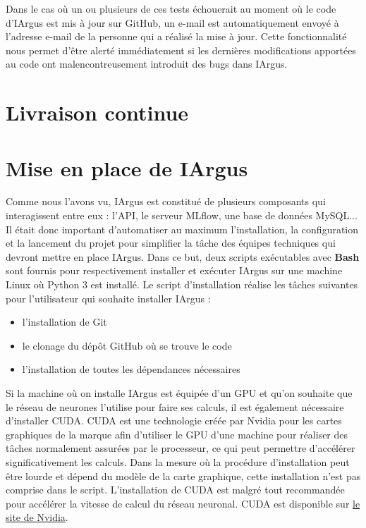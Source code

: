 \documentclass[french]{article}
\begin{document}
    Dans le cas où un ou plusieurs de ces tests échouerait au moment où le code d'IArgus est mis à jour sur GitHub, un e-mail est automatiquement envoyé à l'adresse e-mail de la personne qui a réalisé la mise à jour. Cette fonctionnalité nous permet d'être alerté immédiatement si les dernières modifications apportées au code ont malencontreusement introduit des bugs dans IArgus.


    \section{Livraison continue}
    
    

    \section{Mise en place de IArgus}

    Comme nous l'avons vu, IArgus est constitué de plusieurs composants qui interagissent entre eux : l'API, le serveur MLflow, une base de données MySQL... Il était donc important d'automatiser au maximum l'installation, la configuration et la lancement du projet pour simplifier la tâche des équipes techniques qui devront mettre en place IArgus. Dans ce but, deux scripts exécutables avec \textbf{Bash} sont fournis pour respectivement installer et exécuter IArgus sur une machine Linux où Python 3 est installé. Le script d'installation réalise les tâches suivantes pour l'utilisateur qui souhaite installer IArgus :
    \begin{itemize}
        \item l'installation de Git
        \item le clonage du dépôt GitHub où se trouve le code
        \item l'installation de toutes les dépendances nécessaires
    \end{itemize} 

    Si la machine où on installe IArgus est équipée d'un GPU et qu'on souhaite que le réseau de neurones l'utilise pour faire ses calculs, il est également nécessaire d'installer CUDA. CUDA est une technologie créée par Nvidia pour les cartes graphiques de la marque afin d'utiliser le GPU d'une machine pour réaliser des tâches normalement assurées par le processeur, ce qui peut permettre d'accélérer significativement les calculs. Dans la mesure où la procédure d'installation peut être lourde et dépend du modèle de la carte graphique, cette installation n'est pas comprise dans le script. L'installation de CUDA est malgré tout recommandée pour accélérer la vitesse de calcul du réseau neuronal. CUDA est disponible sur \href{https://developer.nvidia.com/cuda-downloads}{le site de Nvidia}.
\end{document}
